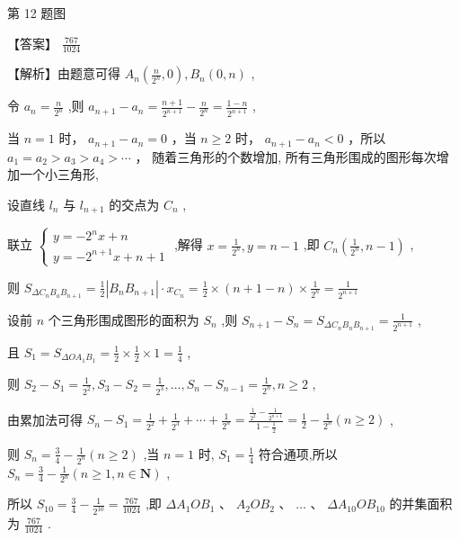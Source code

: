 \documentclass[10pt]{article}
\begin{document}
第 12 题图

【答案】 \(\frac{767}{1024}\)

【解析】由题意可得 \({A}_{n}\left( {\frac{n}{{2}^{n}},0}\right) ,{B}_{n}\left( {0,n}\right)\) ,

令 \({a}_{n} = \frac{n}{{2}^{n}}\) ,则 \({a}_{n + 1} - {a}_{n} = \frac{n + 1}{{2}^{n + 1}} - \frac{n}{{2}^{n}} = \frac{1 - n}{{2}^{n + 1}}\) ,

当 \(n = 1\) 时， \({a}_{n + 1} - {a}_{n} = 0\) ，当 \(n \geq  2\) 时， \({a}_{n + 1} - {a}_{n} < 0\) ，所以 \({a}_{1} = {a}_{2} > {a}_{3} > {a}_{4} > \cdots\) ， 随着三角形的个数增加, 所有三角形围成的图形每次增加一个小三角形,

设直线 \({l}_{n}\) 与 \({l}_{n + 1}\) 的交点为 \({C}_{n}\) ,

联立 \(\left\{  \begin{array}{l} y =  - {2}^{n}x + n \\  y =  - {2}^{n + 1}x + n + 1 \end{array}\right.\) ,解得 \(x = \frac{1}{{2}^{n}},y = n - 1\) ,即 \({C}_{n}\left( {\frac{1}{{2}^{n}},n - 1}\right)\) ,

则 \({S}_{\Delta {C}_{n}{B}_{a}{B}_{n + 1}} = \frac{1}{2}\left| {{B}_{n}{B}_{n + 1}}\right|  \cdot  {x}_{{C}_{n}} = \frac{1}{2} \times  \left( {n + 1 - n}\right)  \times  \frac{1}{{2}^{n}} = \frac{1}{{2}^{n + 1}}\)

设前 \(n\) 个三角形围成图形的面积为 \({S}_{n}\) ,则 \({S}_{n + 1} - {S}_{n} = {S}_{\Delta {C}_{n}{B}_{n}{B}_{n + 1}} = \frac{1}{{2}^{n + 1}}\) ,

且 \({S}_{1} = {S}_{{\Delta O}{A}_{1}{B}_{1}} = \frac{1}{2} \times  \frac{1}{2} \times  1 = \frac{1}{4}\) ,

则 \({S}_{2} - {S}_{1} = \frac{1}{{2}^{2}},{S}_{3} - {S}_{2} = \frac{1}{{2}^{3}},\ldots ,{S}_{n} - {S}_{n - 1} = \frac{1}{{2}^{n}},n \geq  2\) ,

由累加法可得 \({S}_{n} - {S}_{1} = \frac{1}{{2}^{2}} + \frac{1}{{2}^{3}} + \cdots  + \frac{1}{{2}^{n}} = \frac{\frac{1}{{2}^{2}} - \frac{1}{{2}^{n + 1}}}{1 - \frac{1}{2}} = \frac{1}{2} - \frac{1}{{2}^{n}}\left( {n \geq  2}\right)\) ,

则 \({S}_{n} = \frac{3}{4} - \frac{1}{{2}^{n}}\left( {n \geq  2}\right)\) ,当 \(n = 1\) 时, \({S}_{1} = \frac{1}{4}\) 符合通项,所以 \({S}_{n} = \frac{3}{4} - \frac{1}{{2}^{n}}\left( {n \geq  1,n \in  \mathbf{N}}\right)\) ,

所以 \({S}_{10} = \frac{3}{4} - \frac{1}{{2}^{10}} = \frac{767}{1024}\) ,即 \(\Delta {A}_{1}O{B}_{1}\text{ 、 }{A}_{2}O{B}_{2}\text{ 、 }\ldots \text{ 、 }\Delta {A}_{10}O{B}_{10}\) 的并集面积为 \(\frac{767}{1024}\) .
\end{document}
